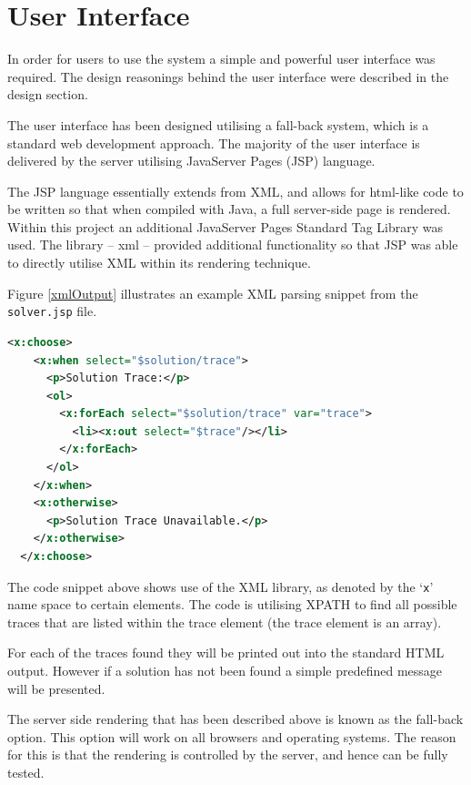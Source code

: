 \section{User Interface}
\label{sec:imp_user_interface}

In order for users to use the system a simple and powerful user interface was 
required. The design reasonings behind the user interface were described in 
the design section.

The user interface has been designed utilising a fall-back system, which is a 
standard web development approach. The majority of the user interface is 
delivered by the server utilising JavaServer Pages (JSP) language.

The JSP language essentially extends from XML, and allows for html-like code to 
be written so that when compiled with Java, a full server-side page is rendered.
Within this project an additional JavaServer Pages Standard Tag Library was 
used. The library -- xml -- provided additional functionality so that JSP was 
able to directly utilise XML within its rendering technique.

Figure \ref{xmlOutput} illustrates an example XML parsing snippet from the 
\texttt{solver.jsp} file.

\begin{lstlisting}[language=XML, 
                   caption={isPatternValid deduces if a given solution pattern 
                            is valid}, 
                   label=xmlOutput] 
  <x:choose>
    <x:when select="$solution/trace">
      <p>Solution Trace:</p>
      <ol>
        <x:forEach select="$solution/trace" var="trace">
          <li><x:out select="$trace"/></li>
        </x:forEach>
      </ol>
    </x:when>
    <x:otherwise>
      <p>Solution Trace Unavailable.</p>
    </x:otherwise>
  </x:choose>
\end{lstlisting}

The code snippet above shows use of the XML library, as denoted by the 
`\texttt{x}' name space to certain elements. The code is utilising XPATH to find
all possible traces that are listed within the trace element (the trace element 
is an array).

For each of the traces found they will be printed out into the standard HTML 
output. However if a solution has not been found a simple predefined message 
will be presented.

The server side rendering that has been described above is known as the 
fall-back option. This option will work on all browsers and operating systems. 
The reason for this is that the rendering is controlled by the server, and hence
can be fully tested.

